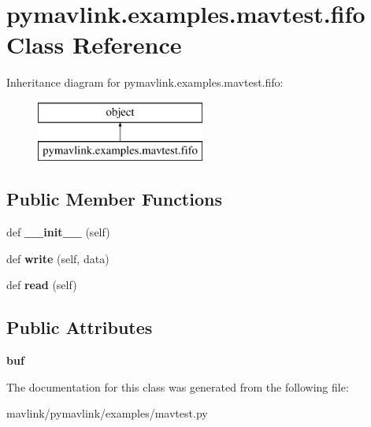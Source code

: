 \hypertarget{classpymavlink_1_1examples_1_1mavtest_1_1fifo}{}\section{pymavlink.\+examples.\+mavtest.\+fifo Class Reference}
\label{classpymavlink_1_1examples_1_1mavtest_1_1fifo}
Inheritance diagram for pymavlink.\+examples.\+mavtest.\+fifo\+:\begin{figure}[H]
\begin{center}
\leavevmode
\includegraphics[height=2.000000cm]{classpymavlink_1_1examples_1_1mavtest_1_1fifo}
\end{center}
\end{figure}
\subsection*{Public Member Functions}
\begin{DoxyCompactItemize}
\item 
\mbox{\label{classpymavlink_1_1examples_1_1mavtest_1_1fifo_a6db7ec373a08745bb51fdd54cef6c60e}} 
def {\bfseries \+\_\+\+\_\+init\+\_\+\+\_\+} (self)
\item 
\mbox{\label{classpymavlink_1_1examples_1_1mavtest_1_1fifo_a88329c0b05c02157f63f92b6a279d2d4}} 
def {\bfseries write} (self, data)
\item 
\mbox{\label{classpymavlink_1_1examples_1_1mavtest_1_1fifo_ab683588c70db38e0fc2fd97780d1f063}} 
def {\bfseries read} (self)
\end{DoxyCompactItemize}
\subsection*{Public Attributes}
\begin{DoxyCompactItemize}
\item 
\mbox{\label{classpymavlink_1_1examples_1_1mavtest_1_1fifo_a6344690e21814b0d91f6f52c0dd4d27c}} 
{\bfseries buf}
\end{DoxyCompactItemize}


The documentation for this class was generated from the following file\+:\begin{DoxyCompactItemize}
\item 
mavlink/pymavlink/examples/mavtest.\+py\end{DoxyCompactItemize}
